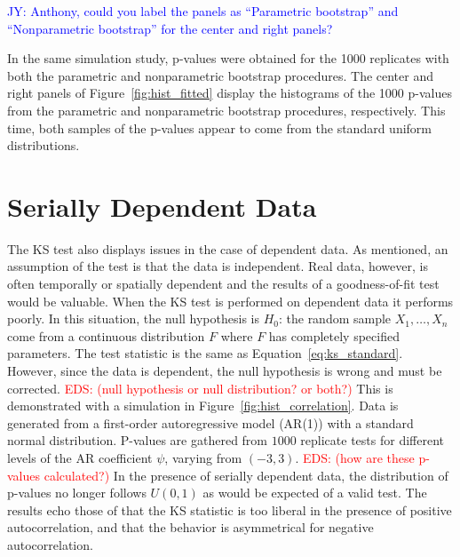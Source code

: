 \documentclass[12pt, letterpaper, titlepage]{article}
\newcommand{\jy}[1]{\textcolor{blue}{JY: #1}}
\newcommand{\eds}[1]{\textcolor{red}{EDS: (#1)}}
\begin{document}
\jy{Anthony, could you label the panels as ``Parametric bootstrap'' and
  ``Nonparametric bootstrap'' for the center and right panels?}

In the same simulation study, p-values were obtained for the 1000 replicates
with both the parametric and nonparametric bootstrap procedures. The center and
right panels of Figure~\ref{fig:hist_fitted} display the histograms of the 1000
p-values from the parametric and nonparametric bootstrap procedures,
respectively. This time, both samples of the p-values appear to come from the
standard uniform distributions.

\section{Serially Dependent Data}
\label{sec:dependence}

The KS test also displays issues in the case of dependent data. As mentioned, an
assumption of the test is that the data is independent. Real data, however,
is often temporally or spatially dependent and the results of a goodness-of-fit
test would be valuable. When the KS test is performed on dependent data it
performs poorly. In this situation, the null hypothesis is $H_0$: the random
sample $X_1, \ldots, X_n$ come from a continuous distribution $F$ where $F$ has
completely specified parameters. The test statistic is the same as
Equation~\eqref{eq:ks_standard}. However, since the data is dependent, the null
hypothesis is wrong and must be corrected.
\eds{null hypothesis or null distribution? or both?}
This is demonstrated with a
simulation in Figure~\ref{fig:hist_correlation}. Data is generated from a
first-order autoregressive model (AR(1)) with a standard normal distribution.
P-values are gathered from $1000$ replicate tests for different levels of the
AR coefficient $\psi$, varying from $(-3,3)$.
\eds{how are these p-values calculated?}
In the presence of serially
dependent data, the distribution of p-values no longer follows $U(0, 1)$ as
would be expected of a valid test. The results echo those of \citet{Durilleul}
that the KS statistic is too liberal in the presence of positive
autocorrelation, and that the behavior is asymmetrical for negative
 autocorrelation.
\end{document}
